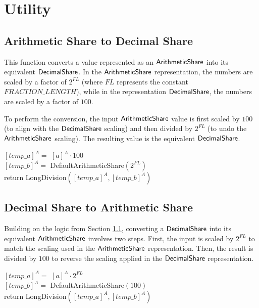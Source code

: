 \section{Utility}
\label{sec:utility}

\subsection{Arithmetic Share to Decimal Share}
\label{sec:arithmetic_share_to_decimal_share}

This function converts a value represented as an ${\mathsf{ArithmeticShare}}$ into its equivalent ${\mathsf{DecimalShare}}$. In the ${\mathsf{ArithmeticShare}}$ representation, the numbers are scaled by a factor of $2^{FL}$ (where $FL$ represents the constant $FRACTION\_LENGTH$), while in the representation ${\mathsf{DecimalShare}}$, the numbers are scaled by a factor of $100$.

To perform the conversion, the input ${\mathsf{ArithmeticShare}}$ value is first scaled by $100$ (to align with the ${\mathsf{DecimalShare}}$ scaling) and then divided by $2^{FL}$ (to undo the ${\mathsf{ArithmeticShare}}$ scaling). The resulting value is the equivalent ${\mathsf{DecimalShare}}$.

\begin{protocol}[ArithmeticShareToDecimalShare$({[a]^A})$]
	${[{temp\_a}]^A} =$ ${[a]^A} \cdot 100$\\
	${[{temp\_b}]^A} =$ DefaultArithmeticShare$(2^{FL})$\\
        return LongDivision$({[{temp\_a}]^A}, {[{temp\_b}]^A})$
\end{protocol}

\subsection{Decimal Share to Arithmetic Share}
\label{sec:decimal_share_to_arithmetic_share}

Building on the logic from Section \ref{sec:arithmetic_share_to_decimal_share}, converting a ${\mathsf{DecimalShare}}$ into its equivalent ${\mathsf{ArithmeticShare}}$ involves two steps. First, the input is scaled by $2^{FL}$ to match the scaling used in the ${\mathsf{ArithmeticShare}}$ representation. Then, the result is divided by $100$ to reverse the scaling applied in the ${\mathsf{DecimalShare}}$ representation.

\begin{protocol}[DecimalShareToArithmeticShare$({[a]^A})$]
	${[{temp\_a}]^A} =$ ${[a]^A} \cdot 2^{FL}$\\
	${[{temp\_b}]^A} =$ DefaultArithmeticShare$(100)$\\
        return LongDivision$({[{temp\_a}]^A}, {[{temp\_b}]^A})$
\end{protocol}

